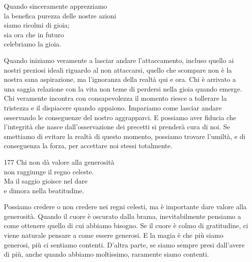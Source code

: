 
\begin{dhpVerse}{16}
\label{dhp-16}
Quando sinceramente apprezziamo\\
la benefica purezza delle nostre azioni\\
siamo ricolmi di gioia;\\
sia ora che in futuro\\
celebriamo la gioia.
\end{dhpVerse}

\begin{dhpRefl}
Quando iniziamo veramente a lasciar andare l'attaccamento, incluso quello ai nostri preziosi ideali riguardo al non attaccarsi, quello che scompare non \`{e} la nostra sana aspirazione, ma l'ignoranza della realt\`{a} qui e ora. Chi \`{e} arrivato a una saggia relazione con la vita non teme di perdersi nella gioia quando emerge. Chi veramente incontra con consapevolezza il momento riesce a tollerare la tristezza e il dispiacere quando appaiono. Impariamo come lasciar andare osservando le conseguenze del nostro aggrapparci. E possiamo aver fiducia che l'integrit\`{a} che nasce dall'osservazione dei precetti si prender\`{a} cura di noi. Se smettiamo di evitare la realt\`{a} di questo momento, possiamo trovare l'umilt\`{a}, e di conseguenza la forza, per accettare noi stessi totalmente.
\end{dhpRefl}


\begin{dhpVerse}{177}
\label{dhp-177}
Chi non d\`{a} valore alla generosit\`{a}\\
non raggiunge il regno celeste.\\
Ma il saggio gioisce nel dare\\
e dimora nella beatitudine.
\end{dhpVerse}

\begin{dhpRefl}
Possiamo credere o non credere nei regni celesti, ma \`{e} importante dare valore alla generosit\`{a}. Quando il cuore \`{e} oscurato dalla brama, inevitabilmente pensiamo a  come ottenere quello di cui abbiamo bisogno. Se il cuore \`{e} colmo di gratitudine, ci viene naturale pensare a come essere generosi. E la magia \`{e} che più siamo generosi, più ci sentiamo contenti. D'altra parte, se siamo sempre presi dall'avere di più, anche quando abbiamo moltissimo, raramente siamo contenti.
\end{dhpRefl}

